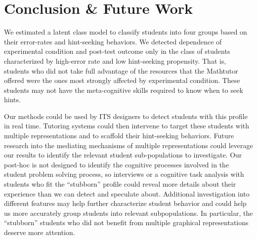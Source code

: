 \documentclass{edm_template}
\begin{document}
\section{Conclusion \& Future Work}
\label{sec:conclusion}

We estimated a latent class model to classify students into four groups based on their error-rates and hint-seeking behaviors. We detected dependence of experimental condition and post-test outcome only in the class of students characterized by high-error rate and low hint-seeking propensity. That is, students who did not take full advantage of the resources that the Mathtutor offered were the ones most strongly affected by experimental condition. These students may not have the meta-cognitive skills required to know when to seek hints. 

Our methods could be used by ITS designers to detect students with this profile in real time. Tutoring systems could then intervene to target these students with multiple representations and to scaffold their hint-seeking behaviors. Future research into  the mediating mechanisms of multiple representations could leverage our results to identify the relevant student sub-populations to investigate. Our post-hoc is not designed to identify the cognitive processes involved in the student problem solving process, so interviews or a cognitive task analysis with students who fit the ``stubborn'' profile could reveal more details about their experience than we can detect and speculate about. Additional investigation into different features may help further characterize student behavior and could help us more accurately group students into relevant subpopulations. In particular, the ``stubborn'' students who did not benefit from multiple graphical representations deserve more attention.



\balancecolumns
\end{document}
